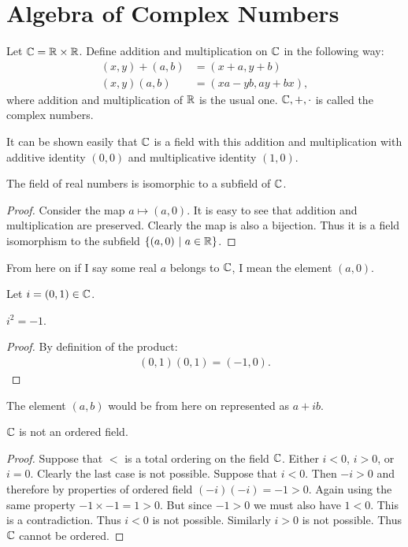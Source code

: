 \section{Algebra of Complex Numbers}
\begin{definition}
  Let $\mathbb{C} = \mathbb{R} \times \mathbb{R}$. Define addition and multiplication on $\mathbb{C}$ in the following way:
  \begin{align*}
    (x,y) + (a,b) &= (x+a,y+b) \\
    (x,y)(a,b) &= (xa-yb, ay+bx),
  \end{align*}
  where addition and multiplication of $\mathbb{R}$ is the usual one. $\mathbb{C}, +, \cdot$ is called the complex numbers.
\end{definition}
\begin{remark}
  It can be shown easily that $\mathbb{C}$ is a field with this addition and multiplication with additive identity $(0,0)$ and multiplicative identity $(1,0)$.
\end{remark}
\begin{proposition}
  The field of real numbers is isomorphic to a subfield of $\mathbb{C}$. 
\end{proposition}
\begin{proof}
  Consider the map $a\mapsto (a,0)$. It is easy to see that addition and multiplication are preserved. Clearly the map is also a bijection. Thus it is a field isomorphism to the subfield $\{(a,0)\ |\ a\in \mathbb{R}\}$.
\end{proof}
\begin{notation}
  From here on if I say some real $a$ belongs to $\mathbb{C}$, I mean the element $(a,0)$.
\end{notation}
\begin{definition}
  Let $i = (0,1)\in \mathbb{C}$.
\end{definition}
\begin{theorem}
  $i^2 = -1$. 
\end{theorem}
\begin{proof}
  By definition of the product:
  \begin{align*}
    (0,1)(0,1) = (-1, 0).
  \end{align*}
\end{proof}
\begin{notation}
  The element $(a,b)$ would be from here on represented as $a+ib$.
\end{notation}
\begin{theorem}
  $\mathbb{C}$ is not an ordered field. 
\end{theorem}
\begin{proof}
  Suppose that $<$ is a total ordering on the field $\mathbb{C}$. Either $i<0$, $i>0$, or $i=0$. Clearly the last case is not possible. Suppose that $i<0$. Then $-i>0$ and therefore by properties of ordered field $(-i)(-i)=-1>0$. Again using the same property $-1\times -1 =1 > 0$. But since $-1>0$ we must also have $1<0$. This is a contradiction. Thus $i<0$ is not possible. Similarly $i>0$ is not possible. Thus $\mathbb{C}$ cannot be ordered.
\end{proof}
